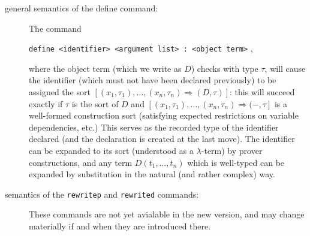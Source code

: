 \documentclass[12pt]{article}
\begin{document}
\begin{description}
\item[general semantics of the define command:]  The command \begin{center}{\tt define <identifier> <argument list> : <object term>} ,\end{center} where the object term  (which we write  as $D$) checks with type $\tau$,
will cause the identifier (which must  not have been declared previously)  to be assigned the sort $[(x_1,\tau_1),\ldots,(x_n,\tau_n) \Rightarrow (D,\tau)]$:  this will succeed exactly if $\tau$ is the sort of $D$ and $[(x_1,\tau_1),\ldots,(x_n,\tau_n) \Rightarrow (-,\tau]$ is a well-formed construction sort (satisfying expected restrictions on variable dependencies, etc.)  This serves as the recorded type of the identifier
declared (and the declaration is created at the last move).  The identifier can be expanded to its sort (understood as a $\lambda$-term) by prover constructions,
and any term $D(t_1,\ldots,t_n)$ which is well-typed can be expanded by substitution in the natural (and rather complex) way.

\item[semantics of the {\tt rewritep} and {\tt rewrited} commands:]  These commands are not yet avialable in the new version, and may change materially if and when they are introduced there.


\end{description}
\end{document}
